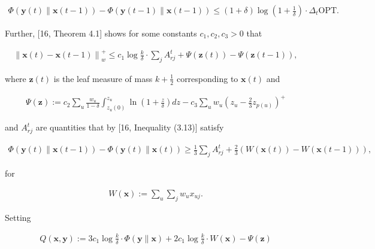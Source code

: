 \[\begin{gathered}
\displaystyle\Phi({\boldsymbol{y}}(t)\parallel{\boldsymbol{x}}(t-1))-\Phi({\boldsymbol{y}}(t-1)\parallel{\boldsymbol{x}}(t-1))\leq(1+\delta)\log\left(1+\frac{1}{\delta}\right)\cdot\Delta_{t}{\text{OPT}}.
\end{gathered}\]




Further, [16, Theorem 4.1] shows for some constants $c_{1},c_{2},c_{3}>0$ that\par


\[\begin{gathered}
\displaystyle\left\|{\boldsymbol{x}}(t)-{\boldsymbol{x}}(t-1)\right\|_{w}^{+}\leq c_{1}\log\frac{k}{\delta}\cdot\sum_{j}A_{rj}^{t}+\Psi({\mathbf{z}}(t))-\Psi({\mathbf{z}}(t-1)),
\end{gathered}\]


where ${\mathbf{z}}(t)$ is the leaf measure of mass $k+\frac{1}{2}$ corresponding to ${\boldsymbol{x}}(t)$ and\par


\[\begin{gathered}
\displaystyle\Psi({\mathbf{z}}):=c_{2}\sum_{u}\frac{w_{u}}{1-\delta}\int_{z_{u}(0)}^{z_{u}}\ln\left(1+\frac{z}{\delta}\right)dz-c_{3}\sum_{u}w_{u}\left(z_{u}-\frac{2}{3}z_{p(u)}\right)^{+}
\end{gathered}\]


and $A_{rj}^{t}$ are quantities that by [16, Inequality (3.13)] satisfy\par


\[\begin{gathered}
\displaystyle\Phi({\boldsymbol{y}}(t)\parallel{\boldsymbol{x}}(t-1))-\Phi({\boldsymbol{y}}(t)\parallel{\boldsymbol{x}}(t))\geq\frac{1}{3}\sum_{j}A_{rj}^{t}+\frac{2}{3}(W({\boldsymbol{x}}(t))-W({\boldsymbol{x}}(t-1))),
\end{gathered}\]


for\par


\[\begin{gathered}
\displaystyle W({\boldsymbol{x}}) \displaystyle:=\sum_{u}\sum_{j}w_{u}x_{uj}.
\end{gathered}\]


Setting\par


\[\begin{gathered}
\displaystyle Q({\boldsymbol{x}},{\boldsymbol{y}}):=3c_{1}\log\frac{k}{\delta}\cdot\Phi({\boldsymbol{y}}\parallel{\boldsymbol{x}})+2c_{1}\log\frac{k}{\delta}\cdot W({\boldsymbol{x}})-\Psi({\mathbf{z}})
\end{gathered}\]


